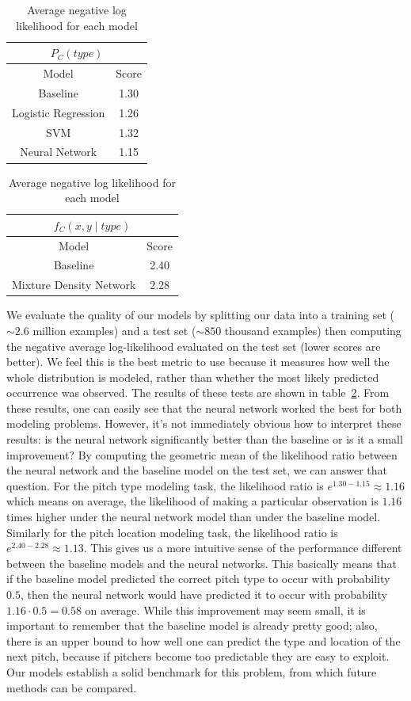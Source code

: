 \documentclass{article}
\begin{document}
\begin{table}[thb]
\centering
\begin{tabular}{|c|c|}
\hline
\multicolumn{2}{|c|}{$P_C(type)$} \\ \hline
Model                 & Score \\\hline
Baseline              & 1.30  \\
Logistic Regression   & 1.26  \\
SVM                   & 1.32  \\
Neural Network        & 1.15  \\\hline
\end{tabular}
\quad
\begin{tabular}{|c|c|}
\hline
\multicolumn{2}{|c|}{$f_C(x,y \mid type)$} \\ \hline
Model                   & Score \\\hline
Baseline                & 2.40  \\
Mixture Density Network & 2.28  \\\hline
\end{tabular}
\caption{Average negative log likelihood for each model} \label{results-table}
\end{table}

We evaluate the quality of our models by splitting our data into a training set ($\sim 2.6$ million examples) and a test set ($\sim 850$ thousand examples) then computing the negative average log-likelihood evaluated on the test set (lower scores are better).  We feel this is the best metric to use because it measures how well the whole distribution is modeled, rather than whether the most likely predicted occurrence was observed.  The results of these tests are shown in table~\ref{results-table}.  From these results, one can easily see that the neural network worked the best for both modeling problems.  However, it's not immediately obvious how to interpret these results: is the neural network significantly better than the baseline or is it a small improvement? By computing the geometric mean of the likelihood ratio between the neural network and the baseline model on the test set, we can answer that question.  For the pitch type modeling task, the likelihood ratio is $ e^{1.30-1.15} \approx 1.16 $ which means on average, the likelihood of making a particular observation is $1.16$ times higher under the neural network model than under the baseline model.  Similarly for the pitch location modeling task, the likelihood ratio is $ e^{2.40 - 2.28} \approx 1.13 $.  This gives us a more intuitive sense of the performance different between the baseline models and the neural networks.  This basically means that if the baseline model predicted the correct pitch type to occur with probability $0.5$, then the neural network would have predicted it to occur with probability $1.16 \cdot 0.5 = 0.58$ on average.  While this improvement may seem small, it is important to remember that the baseline model is already pretty good; also, there is an upper bound to how well one can predict the type and location of the next pitch, because if pitchers become too predictable they are easy to exploit.  Our models establish a solid benchmark for this problem, from which future methods can be compared.  
\end{document}
